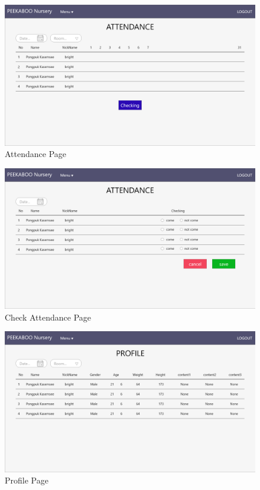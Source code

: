\begin{figure}
  \begin{center}
  \includegraphics[width=140mm]{images/AttendancePage.png}
  \end{center}
  \caption[Poem]{Attendance Page}
  \label{fig:Attendance}
  \end{figure}

\begin{figure}
  \begin{center}
  \includegraphics[width=140mm]{images/AttendancePageChecking.png}
  \end{center}
  \caption[Poem]{Check Attendance Page}
  \label{fig:CheckAttendance}
  \end{figure}

\begin{figure}
  \begin{center}
  \includegraphics[width=140mm]{images/ProfileOnePage.png}
  \end{center}
  \caption[Poem]{Profile Page}
  \label{fig:Profile}
  \end{figure}


